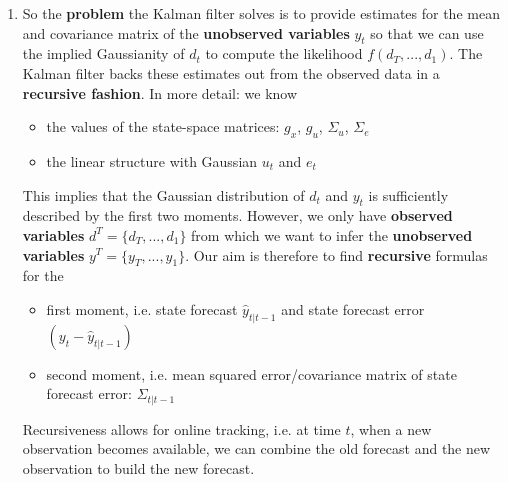 \begin{enumerate}
	\item So the \textbf{problem} the Kalman filter solves is to provide estimates for the mean and covariance matrix of the \textbf{unobserved variables} $y_{t}$ so that we can use the implied Gaussianity of $d_t$ to compute the likelihood $f(d_T,...,d_1)$. The Kalman filter backs these estimates out from the observed data in a \textbf{recursive fashion}. In more detail: we know
	\begin{itemize}
		\item the values of the state-space matrices: $g_x$, $g_u$, $\Sigma_u$, $\Sigma_e$		
		\item the linear structure with Gaussian $u_t$ and $e_t$		
	\end{itemize}
	This implies that the Gaussian distribution of $d_t$ and $y_t$ is sufficiently described by the first two moments. However, we only have \textbf{observed variables} $d^T = \{d_T,...,d_1\}$ from which we want to infer the \textbf{unobserved variables} $y^T = \{y_T,...,y_1\}$. Our aim is therefore to find \textbf{recursive} formulas for the		
	\begin{itemize}
		\item first moment, i.e. state forecast $\hat{y}_{t|t-1}$ and state forecast error $(y_t - \hat{y}_{t|t-1})$
		\item second moment, i.e. mean squared error\slash covariance matrix of state forecast error: $\Sigma_{t|t-1}$		
	\end{itemize}		
	Recursiveness allows for online tracking, i.e. at time $t$, when a new observation becomes available, we can combine the old forecast and the new observation to build the new forecast.
	

\end{enumerate}
